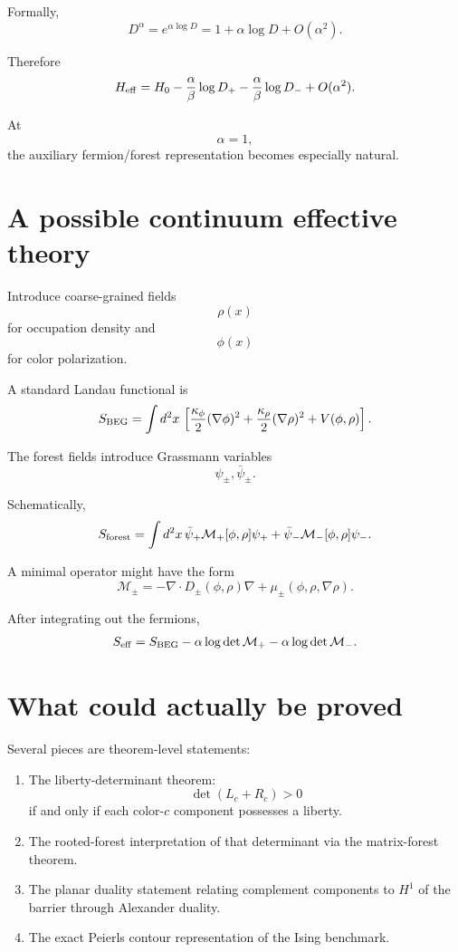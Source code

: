 \documentclass[11pt]{article}
\begin{document}
Formally,
\[
D^\alpha
=
e^{\alpha\log D}
=
1+\alpha\log D+O(\alpha^2).
\]

Therefore
\[
H_{\rm eff}
=
H_0
-\frac{\alpha}{\beta}\log D_+
-\frac{\alpha}{\beta}\log D_-
+O(\alpha^2).
\]

At
\[
\alpha=1,
\]
the auxiliary fermion/forest representation becomes especially natural.

\section{A possible continuum effective theory}

Introduce coarse-grained fields
\[
\rho(x)
\]
for occupation density and
\[
\phi(x)
\]
for color polarization.

A standard Landau functional is
\[
S_{\rm BEG}
=
\int d^2x\,
\left[
\frac{\kappa_\phi}{2}(\nabla\phi)^2
+
\frac{\kappa_\rho}{2}(\nabla\rho)^2
+
V(\phi,\rho)
\right].
\]

The forest fields introduce Grassmann variables
\[
\psi_\pm,\bar\psi_\pm.
\]

Schematically,
\[
S_{\rm forest}
=
\int d^2x\,
\bar\psi_+
\mathcal M_+[\phi,\rho]
\psi_+
+
\bar\psi_-
\mathcal M_-[\phi,\rho]
\psi_-.
\]

A minimal operator might have the form
\[
\mathcal M_\pm
=
-\nabla\cdot
D_\pm(\phi,\rho)
\nabla
+
\mu_\pm(\phi,\rho,\nabla\rho).
\]

After integrating out the fermions,
\[
S_{\rm eff}
=
S_{\rm BEG}
-
\alpha\log\det\mathcal M_+
-
\alpha\log\det\mathcal M_-.
\]

\section{What could actually be proved}

Several pieces are theorem-level statements:

\begin{enumerate}
\item The liberty-determinant theorem:
\[
\det(L_c+R_c)>0
\]
if and only if each color-\(c\) component possesses a liberty.

\item The rooted-forest interpretation of that determinant via the matrix-forest theorem.

\item The planar duality statement relating complement components to \(H^1\) of the barrier through Alexander duality.

\item The exact Peierls contour representation of the Ising benchmark.
\end{enumerate}
\end{document}
